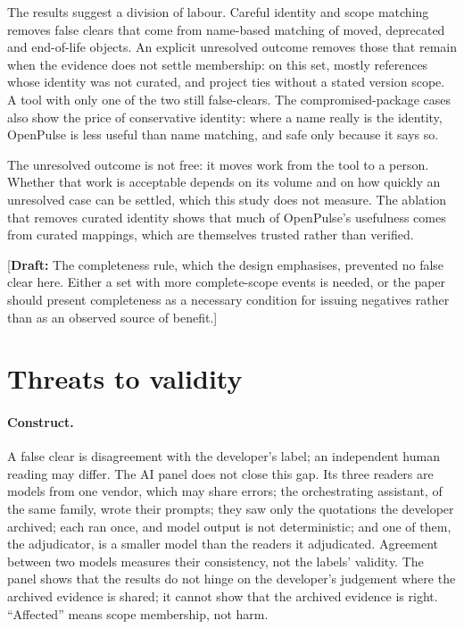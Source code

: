 \documentclass[11pt]{article}
\newcommand{\draftnote}[1]{\textcolor{red!70!black}{[\textbf{Draft:} #1]}}
\begin{document}
The results suggest a division of labour. Careful identity and scope matching
removes false clears that come from name-based matching of moved, deprecated
and end-of-life objects. An explicit unresolved outcome removes those that
remain when the evidence does not settle membership: on this set, mostly
references whose identity was not curated, and project ties without a stated
version scope. A tool with only one of the two still false-clears. The
compromised-package cases also show the price of conservative identity: where
a name really is the identity, OpenPulse is less useful than name matching,
and safe only because it says so.

The unresolved outcome is not free: it moves work from the tool to a person.
Whether that work is acceptable depends on its volume and on how quickly an
unresolved case can be settled, which this study does not measure. The
ablation that removes curated identity shows that much of OpenPulse's
usefulness comes from curated mappings, which are themselves trusted rather
than verified.

\draftnote{The completeness rule, which the design emphasises, prevented no
false clear here. Either a set with more complete-scope events is needed, or
the paper should present completeness as a necessary condition for issuing
negatives rather than as an observed source of benefit.}

\section{Threats to validity}
\label{sec:threats}

\paragraph{Construct.} A false clear is disagreement with the developer's
label; an independent human reading may differ. The AI panel does not close
this gap. Its three readers are models from one vendor, which may share
errors; the orchestrating assistant, of the same family, wrote their prompts;
they saw only the quotations the developer archived; each ran once, and model
output is not deterministic; and one of them, the adjudicator, is a smaller
model than the readers it adjudicated. Agreement between two models measures
their consistency, not the labels' validity. The panel shows that the
results do not hinge on the developer's judgement where the archived
evidence is shared; it cannot show that the archived evidence is right.
``Affected'' means scope membership, not harm.
\end{document}
